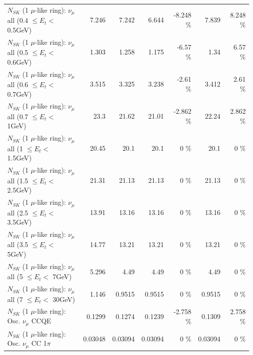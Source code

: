 \begin{table}
\begin{tabular}{| l | r | r | r  r | r  r |}
       $N_{SK}$ (1 $\mu$-like ring): $\nu_{\mu}$ all (0.4 $\leq E_{t} <$ 0.5GeV) &           7.246 &           7.242 &           6.644 &   -8.248 \%  &           7.839 &    8.248 \%  \\ 
       $N_{SK}$ (1 $\mu$-like ring): $\nu_{\mu}$ all (0.5 $\leq E_{t} <$ 0.6GeV) &           1.303 &           1.258 &           1.175 &    -6.57 \%  &            1.34 &     6.57 \%  \\ 
       $N_{SK}$ (1 $\mu$-like ring): $\nu_{\mu}$ all (0.6 $\leq E_{t} <$ 0.7GeV) &           3.515 &           3.325 &           3.238 &    -2.61 \%  &           3.412 &     2.61 \%  \\ 
         $N_{SK}$ (1 $\mu$-like ring): $\nu_{\mu}$ all (0.7 $\leq E_{t} <$ 1GeV) &            23.3 &           21.62 &           21.01 &   -2.862 \%  &           22.24 &    2.862 \%  \\ 
         $N_{SK}$ (1 $\mu$-like ring): $\nu_{\mu}$ all (1 $\leq E_{t} <$ 1.5GeV) &           20.45 &            20.1 &            20.1 &        0 \%  &            20.1 &        0 \%  \\ 
       $N_{SK}$ (1 $\mu$-like ring): $\nu_{\mu}$ all (1.5 $\leq E_{t} <$ 2.5GeV) &           21.31 &           21.13 &           21.13 &        0 \%  &           21.13 &        0 \%  \\ 
       $N_{SK}$ (1 $\mu$-like ring): $\nu_{\mu}$ all (2.5 $\leq E_{t} <$ 3.5GeV) &           13.91 &           13.16 &           13.16 &        0 \%  &           13.16 &        0 \%  \\ 
         $N_{SK}$ (1 $\mu$-like ring): $\nu_{\mu}$ all (3.5 $\leq E_{t} <$ 5GeV) &           14.77 &           13.21 &           13.21 &        0 \%  &           13.21 &        0 \%  \\ 
           $N_{SK}$ (1 $\mu$-like ring): $\nu_{\mu}$ all (5 $\leq E_{t} <$ 7GeV) &           5.296 &            4.49 &            4.49 &        0 \%  &            4.49 &        0 \%  \\ 
          $N_{SK}$ (1 $\mu$-like ring): $\nu_{\mu}$ all (7 $\leq E_{t} <$ 30GeV) &           1.146 &          0.9515 &          0.9515 &        0 \%  &          0.9515 &        0 \%  \\ 
\hline
\hline
                               $N_{SK}$ (1 $\mu$-like ring): Osc. $\nu_\mu$ CCQE &          0.1299 &          0.1274 &          0.1239 &   -2.758 \%  &          0.1309 &    2.758 \%  \\ 
                          $N_{SK}$ (1 $\mu$-like ring): Osc. $\nu_\mu$ CC 1$\pi$ &         0.03048 &         0.03094 &         0.03094 &        0 \%  &         0.03094 &        0 \%  \\ 

\end{tabular}
\end{table}
